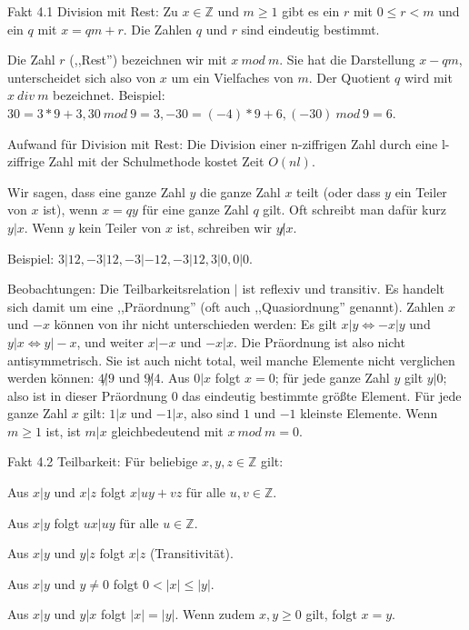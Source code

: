 \documentclass[a4paper]{article}
\begin{document}
\begin{multicols}{3}
    Fakt 4.1 Division mit Rest: Zu $x\in\mathbb{Z}$ und $m\geq 1$ gibt es ein $r$ mit $0\leq r < m$ und ein $q$ mit $x=qm+r$. Die Zahlen $q$ und $r$ sind eindeutig bestimmt.

    Die Zahl $r$ (,,Rest'') bezeichnen wir mit $x\ mod\ m$. Sie hat die Darstellung $x-qm$, unterscheidet sich also von $x$ um ein Vielfaches von $m$. Der Quotient $q$ wird mit $x\ div\ m$ bezeichnet.
    Beispiel: $30 = 3*9 + 3, 30\ mod\ 9 = 3, -30 = (-4) *9 + 6, (-30)\ mod\ 9 = 6$.

    Aufwand für Division mit Rest: Die Division einer n-ziffrigen Zahl durch eine l-ziffrige Zahl mit der Schulmethode kostet Zeit $O(nl)$.

    Wir sagen, dass eine ganze Zahl $y$ die ganze Zahl $x$ teilt (oder dass $y$ ein Teiler von $x$ ist), wenn $x=qy$ für eine ganze Zahl $q$ gilt. Oft schreibt man dafür kurz $y|x$. Wenn $y$ kein Teiler von $x$ ist, schreiben wir $y\not|x$.

    Beispiel: $3|12,-3|12,-3|-12,-3|12,3|0,0|0$.

    Beobachtungen: Die Teilbarkeitsrelation $|$ ist reflexiv und transitiv. Es handelt sich damit um eine ,,Präordnung'' (oft auch ,,Quasiordnung'' genannt). Zahlen $x$ und $-x$ können von ihr nicht unterschieden werden: Es gilt $x|y\Leftrightarrow -x|y$ und $y|x\Leftrightarrow y|-x$, und weiter $x|-x$ und $-x|x$. Die Präordnung ist also nicht antisymmetrisch. Sie ist auch nicht total, weil manche Elemente nicht verglichen werden können: $4\not|9$ und $9\not|4$. Aus $0|x$ folgt $x=0$; für jede ganze Zahl $y$ gilt $y|0$; also ist in dieser Präordnung $0$ das eindeutig bestimmte größte Element. Für jede ganze Zahl $x$ gilt: $1|x$ und $-1|x$, also sind $1$ und $-1$ kleinste Elemente. Wenn $m\geq 1$ ist, ist $m|x$ gleichbedeutend mit $x\ mod\ m= 0$.

    Fakt 4.2 Teilbarkeit: Für beliebige $x,y,z\in\mathbb{Z}$ gilt:
    \begin{enumerate*}
        \item Aus $x|y$ und $x|z$ folgt $x|uy+vz$ für alle $u,v\in\mathbb{Z}$.
        \item  Aus $x|y$ folgt $ux|uy$ für alle $u\in\mathbb{Z}$.
        \item  Aus $x|y$ und $y|z$ folgt $x|z$ (Transitivität).
        \item  Aus $x|y$ und $y\not= 0$ folgt $0<|x|\leq |y|$.
        \item  Aus $x|y$ und $y|x$ folgt $|x|=|y|$. Wenn zudem $x,y\geq 0$ gilt, folgt $x=y$.
    \end{enumerate*}


\end{multicols}
\end{document}
